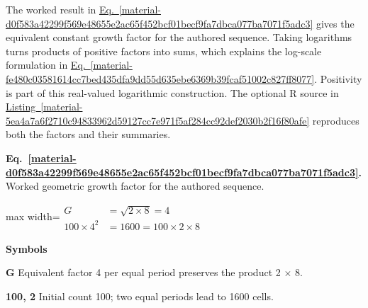\documentclass[11pt,a4paper]{article}
\begin{document}
The worked result in \hyperref[material-d0f583a42299f569e48655e2ac65f452bcf01becf9fa7dbca077ba7071f5adc3]{Eq.~\ref*{material-d0f583a42299f569e48655e2ac65f452bcf01becf9fa7dbca077ba7071f5adc3}} gives the equivalent constant growth factor for the authored sequence. Taking logarithms turns products of positive factors into sums, which explains the log-scale formulation in \hyperref[material-fe480c03581614cc7bed435dfa9dd55d635ebe6369b39fcaf51002c827ff8077]{Eq.~\ref*{material-fe480c03581614cc7bed435dfa9dd55d635ebe6369b39fcaf51002c827ff8077}}. Positivity is part of this real-valued logarithmic construction. The optional R source in \hyperref[material-5ea4a7a6f2710c94833962d59127cc7e971f5af284cc92def2030b2f16f80afe]{Listing~\ref*{material-5ea4a7a6f2710c94833962d59127cc7e971f5af284cc92def2030b2f16f80afe}} reproduces both the factors and their summaries.


\par\medskip
\noindent\begin{minipage}{\linewidth}
\label{material-d0f583a42299f569e48655e2ac65f452bcf01becf9fa7dbca077ba7071f5adc3}
\noindent\textbf{Eq.~\ref*{material-d0f583a42299f569e48655e2ac65f452bcf01becf9fa7dbca077ba7071f5adc3}.} Worked geometric growth factor for the authored sequence.\par\nopagebreak
\begin{center}\begin{adjustbox}{max width=\linewidth}$\displaystyle \begin{aligned}G&=\sqrt{2\times8}=4\\100\times4^2&=1600=100\times2\times8\end{aligned}$\end{adjustbox}\end{center}

\par\noindent\textbf{Symbols}

\par\noindent\textbf{G} Equivalent factor 4 per equal period preserves the product 2 \ensuremath{\times} 8.

\par\noindent\textbf{100, 2} Initial count 100; two equal periods lead to 1600 cells.

\end{minipage}\par
\medskip
\end{document}
